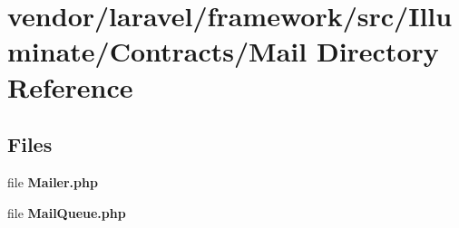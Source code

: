 \section{vendor/laravel/framework/src/\+Illuminate/\+Contracts/\+Mail Directory Reference}
\label{dir_8e775898acb56081ff501246e3b25e9a}
\subsection*{Files}
\begin{DoxyCompactItemize}
\item 
file {\bf Mailer.\+php}
\item 
file {\bf Mail\+Queue.\+php}
\end{DoxyCompactItemize}
